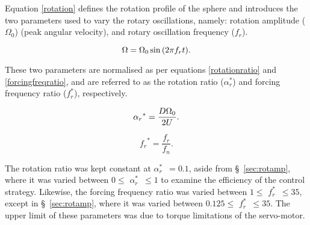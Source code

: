 \documentclass[3p]{elsarticle}
\newcommand{\velrat}{\ensuremath{\alpha_r^*}}
\newcommand{\freqrat}{\ensuremath{f_r^*}}
\begin{document}
Equation \ref{rotation} defines the rotation profile of the sphere and
introduces the two parameters used to vary the rotary oscillations,
namely: rotation amplitude ($\Omega_0$) (peak angular velocity), and
rotary oscillation frequency ($f_r$).

\begin{equation}
\label{rotation} \Omega={\Omega_0}\sin{(2\pi{f_r}t)}.\\
\end{equation}

These two parameters are normalised as per equations
\ref{rotationratio} and \ref{forcingfreqratio}, and are referred to as
the rotation ratio (\velrat) and forcing frequency ratio (\freqrat),
respectively.

\begin{equation}
\label{rotationratio} {\alpha_r}^*=\frac{D\Omega_0}{2U}.\\
\end{equation}

\begin{equation}
\label{forcingfreqratio} {f_r}^*= \frac{f_r}{f_{n}}.
\end{equation}

The rotation ratio was kept constant at \velrat~$=0.1$, aside from
\S~\ref{sec:rotamp}, where it was varied between $0\leqslant$ \velrat~$\leqslant1$
to examine the efficiency of the control strategy. Likewise, the
forcing frequency ratio was varied between $1\leqslant$ \freqrat~$\leqslant35$,
except in \S~\ref{sec:rotamp}, where it was varied between $0.125\leqslant$
\freqrat~$\leqslant35$. The upper limit of these parameters was due to
torque limitations of the servo-motor.
%
\end{document}
